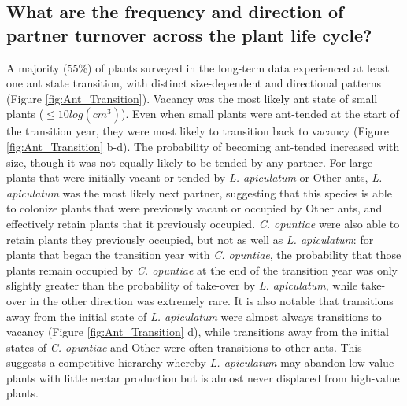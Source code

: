 \documentclass[11pt]{article}
\begin{document}
\subsection*{What are the frequency and direction of partner turnover across the plant life cycle?}
A majority (55\%) of plants surveyed in the long-term data experienced at least one ant state transition, with distinct size-dependent and directional patterns (Figure \ref{fig:Ant_Transition}). 
Vacancy was the most likely ant state of small plants ($\leq 10 log(cm^3)$).
Even when small plants were ant-tended at the start of the transition year, they were most likely to transition back to vacancy (Figure \ref{fig:Ant_Transition} b-d). 
The probability of becoming ant-tended increased with size, though it was not equally likely to be tended by any partner.  
For large plants that were initially vacant or tended by \textit{L. apiculatum} or Other ants, \textit{L. apiculatum} was the most likely next partner, suggesting that this species is able to colonize plants that were previously vacant or occupied by Other ants, and effectively retain plants that it previously occupied.  
\textit{C. opuntiae} were also able to retain plants they previously occupied, but not as well as \textit{L. apiculatum}: for plants that began the transition year with \textit{C. opuntiae}, the probability that those plants remain occupied by \textit{C. opuntiae} at the end of the transition year was only slightly greater than the probability of take-over by \textit{L. apiculatum}, while take-over in the other direction was extremely rare. 
It is also notable that transitions away from the initial state of \textit{L. apiculatum} were almost always transitions to vacancy (Figure \ref{fig:Ant_Transition} d), while transitions away from the initial states of \textit{C. opuntiae} and Other  were often transitions to other ants. 
This suggests a competitive hierarchy whereby \textit{L. apiculatum} may abandon low-value plants with little nectar production but is almost never displaced from high-value plants. 
\end{document}
